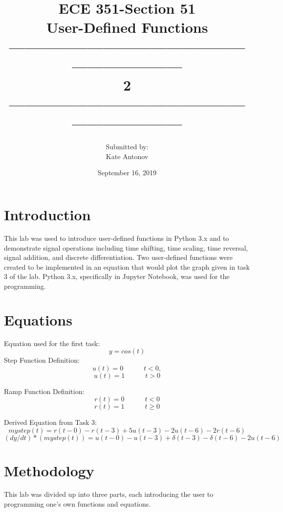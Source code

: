 \documentclass[12pt]{article}
\title{ECE 351-Section 51 \\ User-Defined Functions \\ ------------------------------------------------------------------\\ 2 \\------------------------------------------------------------------}
\author{Submitted by: \\  Kate Antonov}
\date{September 16, 2019}
\begin{document}
\vspace{\fill}

\maketitle

\vspace{\fill}
\thispagestyle{empty}
\clearpage

\clearpage
\thispagestyle{empty}
\tableofcontents
\clearpage

\section{Introduction}
This lab was used to introduce user-defined functions in Python 3.x and to demonstrate signal operations including time shifting, time scaling, time reversal, signal addition, and discrete differentiation. Two user-defined functions were created to be implemented in an equation that would plot the graph given in task 3 of the lab. Python 3.x, specifically in Jupyter Notebook, was used for the programming.
\section{Equations}
Equation used for the first task:
\[y= cos(t)\]
Step Function Definition:
\[u(t) = 0  \hspace{3em} t < 0,\]
\[u(t) = 1  \hspace{3em} t > 0\]

Ramp Function Definition:
\[r(t) = 0 \hspace{3em} t < 0\]
\[r(t) = 1 \hspace{3em} t 	\geq 0\]

Derived Equation from Task 3:
\[mystep(t) = r(t-0) - r(t-3) + 5u(t-3) - 2u(t-6) - 2r(t-6)\]
\[(dy/dt)*(mystep(t)) = u(t-0) - u(t-3) + \delta (t-3) - \delta(t-6) - 2u(t-6)\]

\section{ Methodology}
This lab was divided up into three parts, each introducing the user to programming one's own functions and equations.
\end{document}
